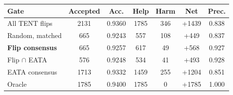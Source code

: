 \begin{tabular}{@{}lcccccc@{}}
\toprule
Gate & Accepted & Acc. & Help & Harm & Net & Prec. \\
\midrule
All TENT flips & 2131 & 0.9360 & 1785 & 346 & +1439 & 0.838 \\
Random, matched & 665 & 0.9243 & 557 & 108 & +449 & 0.837 \\
\textbf{Flip consensus} & 665 & 0.9257 & 617 & 49 & +568 & 0.927 \\
Flip $\cap$ EATA & 576 & 0.9248 & 534 & 41 & +493 & 0.928 \\
EATA consensus & 1713 & 0.9332 & 1459 & 255 & +1204 & 0.851 \\
Oracle & 1785 & 0.9400 & 1785 & 0 & +1785 & 1.000 \\
\bottomrule
\end{tabular}